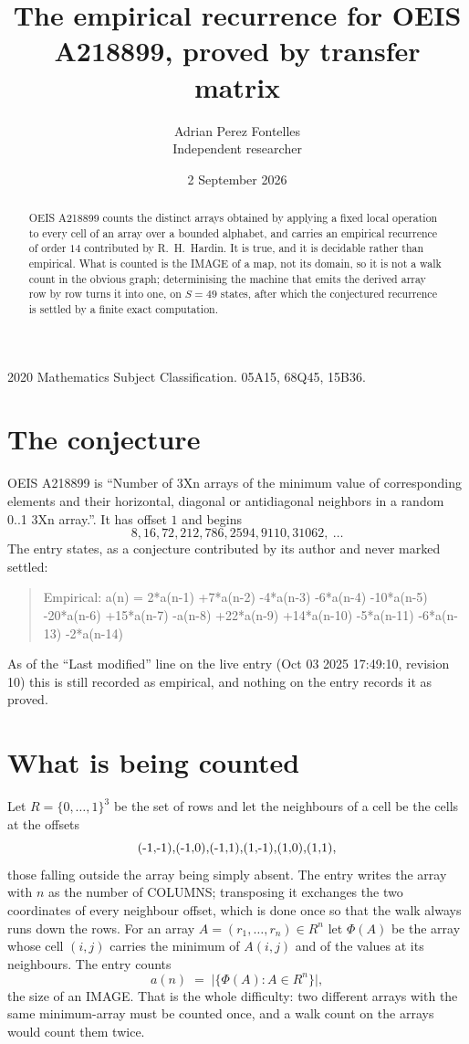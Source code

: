 \documentclass[11pt,a4paper]{article}
\title{The empirical recurrence for OEIS A218899, proved by transfer matrix}
\author{Adrian Perez Fontelles\\ \small Independent researcher}
\date{2 September 2026}
\theoremstyle{plain}
\theoremstyle{definition}
\begin{document}
\maketitle

\begin{abstract}
OEIS A218899 counts the distinct arrays obtained by applying a fixed local operation to every cell
of an array over a bounded alphabet, and carries an empirical recurrence of order $14$
contributed by R.~H.~Hardin. It is true, and it is decidable rather than empirical. What is
counted is the IMAGE of a map, not its domain, so it is not a walk count in the obvious graph;
determinising the machine that emits the derived array row by row turns it into one, on
$S=49$ states, after which the conjectured recurrence is settled by a finite exact
computation.
\end{abstract}

\noindent\small 2020 Mathematics Subject Classification. 05A15, 68Q45, 15B36.\normalsize

\section{The conjecture}

OEIS A218899 is ``Number of 3Xn arrays of the minimum value of corresponding elements and their horizontal, diagonal or antidiagonal neighbors in a random 0..1 3Xn array.''. It has offset $1$ and begins
\[
8, 16, 72, 212, 786, 2594, 9110, 31062,\ \dots
\]
The entry states, as a conjecture contributed by its author and never marked settled:
\begin{quote}
Empirical: a(n) = 2*a(n-1) +7*a(n-2) -4*a(n-3) -6*a(n-4) -10*a(n-5) -20*a(n-6) +15*a(n-7) -a(n-8) +22*a(n-9) +14*a(n-10) -5*a(n-11) -6*a(n-13) -2*a(n-14)
\end{quote}
As of the ``Last modified'' line on the live entry (Oct 03 2025 17:49:10, revision 10) this is still
recorded as empirical, and nothing on the entry records it as proved.

\section{What is being counted}

Let $R=\{0,\dots,1\}^{3}$ be the set of rows and let the neighbours of
a cell be the cells at the offsets
\[
$(-1,-1)$, $(-1,0)$, $(-1,1)$, $(1,-1)$, $(1,0)$, $(1,1)$,
\]
those falling outside the array being simply absent. The entry writes the array with $n$ as the number of COLUMNS; transposing it exchanges the two coordinates of every neighbour offset, which is done once so that the walk always runs down the rows. For an array
$A=(r_1,\dots,r_n)\in R^n$ let $\Phi(A)$ be the array whose cell $(i,j)$ carries the
minimum of $A(i,j)$ and of the values at its neighbours. The entry counts
\[
a(n)\;=\;\bigl|\{\Phi(A):A\in R^n\}\bigr| ,
\]
the size of an IMAGE. That is the whole difficulty: two different arrays with the same
minimum-array must be counted once, and a walk count on the arrays would count them twice.
\end{document}
